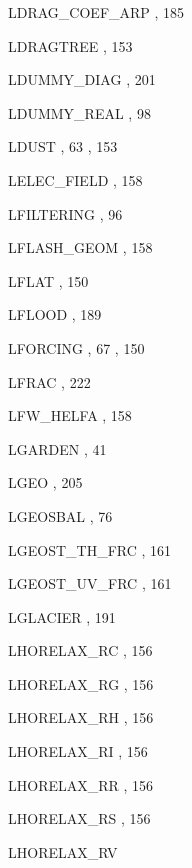 \begin{theindex}
  \item LDRAG\_COEF\_ARP
    \subitem {},  185
  \item LDRAGTREE
    \subitem {},  153
  \item LDUMMY\_DIAG
    \subitem {},  201
  \item LDUMMY\_REAL
    \subitem {},  98
  \item LDUST
    \subitem {},  63
    \subitem {},  153
  \item LELEC\_FIELD
    \subitem {},  158
  \item LFILTERING
    \subitem {},  96
  \item LFLASH\_GEOM
    \subitem {},  158
  \item LFLAT
    \subitem {},  150
  \item LFLOOD
    \subitem {},  189
  \item LFORCING
    \subitem {},  67
    \subitem {},  150
  \item LFRAC
    \subitem {},  222
  \item LFW\_HELFA
    \subitem {},  158
  \item LGARDEN
    \subitem {},  41
  \item LGEO
    \subitem {},  205
  \item LGEOSBAL
    \subitem {},  76
  \item LGEOST\_TH\_FRC
    \subitem {},  161
  \item LGEOST\_UV\_FRC
    \subitem {},  161
  \item LGLACIER
    \subitem {},  191
  \item LHORELAX\_RC
    \subitem {},  156
  \item LHORELAX\_RG
    \subitem {},  156
  \item LHORELAX\_RH
    \subitem {},  156
  \item LHORELAX\_RI
    \subitem {},  156
  \item LHORELAX\_RR
    \subitem {},  156
  \item LHORELAX\_RS
    \subitem {},  156
  \item LHORELAX\_RV

\end{theindex}
